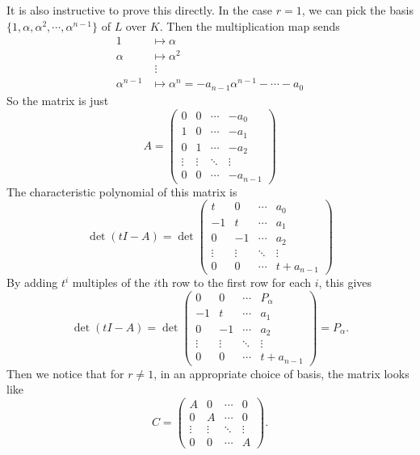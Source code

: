 \documentclass[a4paper]{article}
\begin{document}
It is also instructive to prove this directly. In the case $r = 1$, we can pick the basis $\{1, \alpha, \alpha^2, \cdots, \alpha^{n - 1}\}$ of $L$ over $K$. Then the multiplication map sends
\begin{align*}
  1 &\mapsto \alpha\\
  \alpha &\mapsto \alpha^2\\
  &\;\vdots\\
  \alpha^{n-1} &\mapsto \alpha^n = -a_{n - 1} \alpha^{n - 1} - \cdots - a_0
\end{align*}
So the matrix is just
\[
  A = \begin{pmatrix}
    0 & 0 & \cdots & -a_0\\
    1 & 0 & \cdots & -a_1\\
    0 & 1 & \cdots & -a_2\\
    \vdots & \vdots & \ddots & \vdots\\
    0 & 0 & \cdots & -a_{n - 1}
  \end{pmatrix}
\]
The characteristic polynomial of this matrix is
\[
  \det(tI - A) = \det
  \begin{pmatrix}
    t & 0 & \cdots & a_0\\
    -1 & t & \cdots & a_1\\
    0 & -1 & \cdots & a_2\\
    \vdots & \vdots & \ddots & \vdots\\
    0 & 0 & \cdots & t + a_{n - 1}
  \end{pmatrix}
\]
By adding $t^i$ multiples of the $i$th row to the first row for each $i$, this gives
\[
  \det (tI - A) = \det
  \begin{pmatrix}
    0 & 0 & \cdots & P_\alpha\\
    -1 & t & \cdots & a_1\\
    0 & -1 & \cdots & a_2\\
    \vdots & \vdots & \ddots & \vdots\\
    0 & 0 & \cdots & t + a_{n - 1}
  \end{pmatrix} = P_\alpha.
\]
Then we notice that for $r \not= 1$, in an appropriate choice of basis, the matrix looks like
\[
  C = \begin{pmatrix}
    A & 0 & \cdots & 0\\
    0 & A & \cdots & 0\\
    \vdots & \vdots & \ddots & \vdots\\
    0 & 0 & \cdots & A
  \end{pmatrix}.
\]
\end{document}
